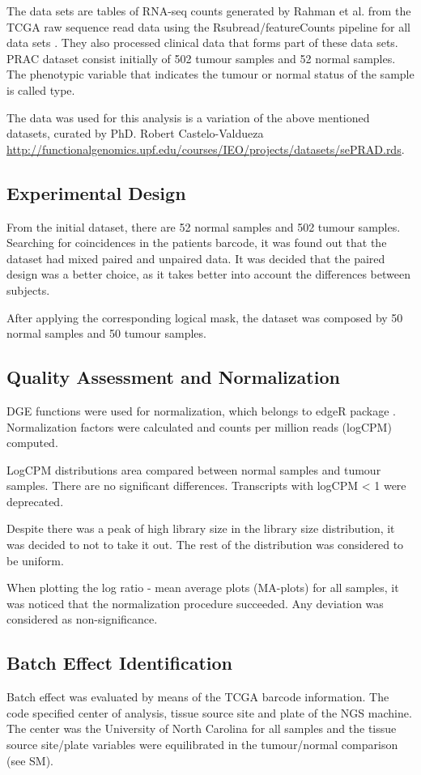 \documentclass[9pt,twocolumn,twoside]{gsajnl}
\begin{document}
The data sets are tables of RNA-seq counts generated by Rahman et al. \cite{Rahman15112015} from the TCGA raw sequence read data using the Rsubread/featureCounts pipeline for all data sets \cite{Rsubread}. They also processed clinical data that forms part of these data sets. PRAC dataset consist initially of 502 tumour samples and 52 normal samples. The phenotypic variable that indicates the tumour or normal status of the sample is called type.

The data was used for this analysis is a variation of the above mentioned datasets, curated by PhD. Robert Castelo-Valdueza \url{http://functionalgenomics.upf.edu/courses/IEO/projects/datasets/sePRAD.rds}.

\subsection*{Experimental Design}
From the initial dataset, there are 52 normal samples and 502 tumour samples. Searching for coincidences in the patients barcode, it was found out that the dataset had mixed paired and unpaired data. It was decided that the paired design was a better choice, as it takes better into account the differences between subjects.

After applying the corresponding logical mask, the dataset was composed by 50 normal samples and 50 tumour samples.

\subsection*{Quality Assessment and Normalization}
DGE functions were used for normalization, which belongs to edgeR package \cite{Robinson01012010}. Normalization factors were calculated and counts per million reads (logCPM) computed.

LogCPM distributions area compared between normal samples and tumour samples. There are no significant differences. Transcripts with logCPM < 1 were deprecated.

Despite there was a peak of high library size in the library size distribution, it was decided to not to take it out. The rest of the distribution was considered to be uniform.

When plotting the log ratio - mean average plots (MA-plots) for all samples, it was noticed that the normalization procedure succeeded. Any deviation was considered as non-significance.

\subsection*{Batch Effect Identification}
Batch effect was evaluated by means of the TCGA barcode information. The code specified center of analysis, tissue source site and plate of the NGS machine. The center was the University of North Carolina for all samples and the tissue source site/plate variables were equilibrated in the tumour/normal comparison (see SM).
\end{document}
